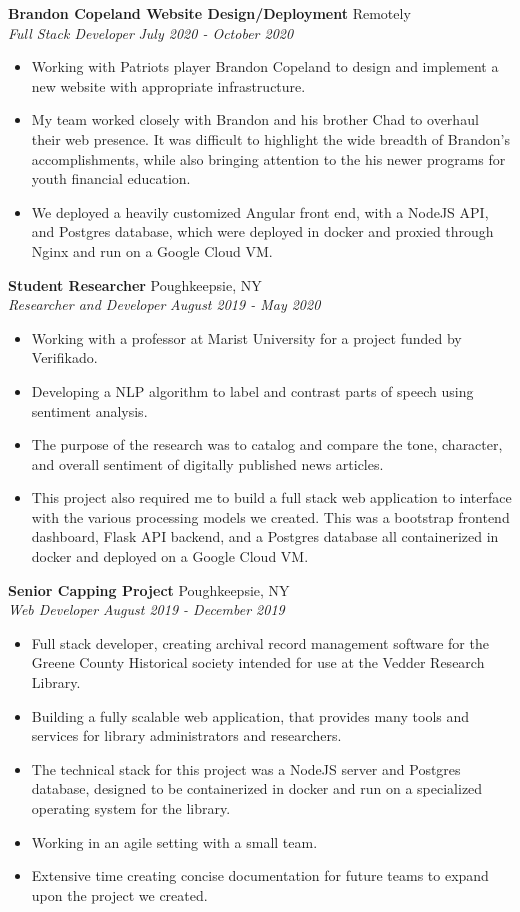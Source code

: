 \documentclass[letterpaper,11pt]{article}
\newcommand{\resumeItem}[2]{
    \item\small{
        \textbf{#1}{#2 \vspace{-2pt}}
    }
}
\newcommand{\resumeSubheading}[4]{
    \vspace{-1pt}
        \item \textbf{#1} \hfill #2 \\
        \textit{\small#3} \hfill \textit{\small #4} \\
    \vspace{-8pt}
}
\newcommand{\resumeItemListStart}{\begin{itemize}}
\newcommand{\resumeItemListEnd}{\end{itemize}\vspace{0pt}}
\begin{document}
    \vspace{-1.00mm}

    \resumeSubheading
        {Brandon Copeland Website Design/Deployment}{Remotely}
        {Full Stack Developer}{July 2020 - October 2020}
        \resumeItemListStart
            \resumeItem{}
                {Working with Patriots player Brandon Copeland to design and implement a new website with appropriate infrastructure.}
            \resumeItem{}
                {My team worked closely with Brandon and his brother Chad to overhaul their web presence. It was difficult to highlight the wide breadth of Brandon's accomplishments, while also bringing attention to the his newer programs for youth financial education.}
            \resumeItem{}
                {We deployed a heavily customized Angular front end, with a NodeJS API, and Postgres database, which were deployed in docker and proxied through Nginx and run on a Google Cloud VM.}
        \resumeItemListEnd

    \vspace{-1.00mm}

    \resumeSubheading
        {Student Researcher}{Poughkeepsie, NY}
        {Researcher and Developer}{August 2019 - May 2020}
        \resumeItemListStart
            \resumeItem{}
                {Working with a professor at Marist University for a project funded by Verifikado.}
            \resumeItem{}
                {Developing a NLP algorithm to label and contrast parts of speech using sentiment analysis.}
            \resumeItem{}
                {The purpose of the research was to catalog and compare the tone, character, and overall sentiment of digitally published news articles.}
            \resumeItem{}
                {This project also required me to build a full stack web application to interface with the various processing models we created. This was a bootstrap frontend dashboard, Flask API backend, and a Postgres database all containerized in docker and deployed on a Google Cloud VM.}
        \resumeItemListEnd

    \vspace{-1.00mm}

    \resumeSubheading
        {Senior Capping Project}{Poughkeepsie, NY}
        {Web Developer}{August 2019 - December 2019}
        \resumeItemListStart
            \resumeItem{}
                {Full stack developer, creating archival record management software for the Greene County Historical society intended for use at the Vedder Research Library.}
            \resumeItem{}
                {Building a fully scalable web application, that provides many tools and services for library administrators and researchers.}
            \resumeItem{}
                {The technical stack for this project was a NodeJS server and Postgres database, designed to be containerized in docker and run on a specialized operating system for the library.}
            \resumeItem{}
                {Working in an agile setting with a small team.}
            \resumeItem{}
                {Extensive time creating concise documentation for future teams to expand upon the project we created.}
        \resumeItemListEnd
\end{document}
